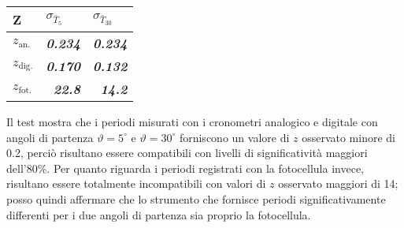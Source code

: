 \documentclass{article}
\begin{document}
	
	\begin{table}[H]
		\centering
		\begin{tabular}{@{}lrr@{}}
			\toprule
			Z & \multicolumn{1}{l}{$\sigma_{\bar{T}_5}$} & \multicolumn{1}{l}{$\sigma_{\bar{T}_{30}}$} \\ \midrule
			$z_{\text{an.}}$      & \textit{\textbf{0.234}}                  & \textit{\textbf{0.234}}                   \\
			$z_{\text{dig.}}$     & \textit{\textbf{0.170}}                  & \textit{\textbf{0.132}}                   \\
			$z_{\text{fot.}}$     & \textit{\textbf{22.8}}                   & \textit{\textbf{14.2}}                    \\ \bottomrule
		\end{tabular}
	\end{table}
	
	Il test mostra che i periodi misurati con i cronometri analogico e digitale con angoli di partenza $\vartheta = 5^\circ$ e $\vartheta = 30^\circ$ forniscono un valore di $z$ osservato minore di 0.2, perciò  risultano essere compatibili con livelli di significatività maggiori dell'80\%. Per quanto riguarda i periodi registrati con la fotocellula invece, risultano essere totalmente incompatibili con valori di $z$ osservato maggiori di 14; posso quindi affermare che lo strumento che fornisce periodi significativamente differenti per i due angoli di partenza sia proprio la fotocellula.
	
	
	
	
	
	
	
	
	
	\newpage
\end{document}
